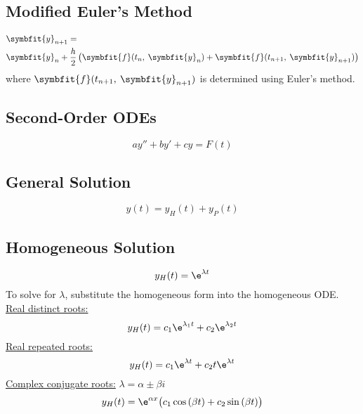 \documentclass{article}
\begin{document}
\begin{multicols}{3}
    \subsection*{Modified Euler's Method}
    \begin{align*}
         & \symbfit{y}_{n+1} =                                                                                                       \\
         & \symbfit{y}_{n} + \frac{h}{2}\left( \symbfit{f}(t_n,\: \symbfit{y}_n) + \symbfit{f}(t_{n+1},\: \symbfit{y}_{n+1}) \right)
    \end{align*}
    where \(\symbfit{f}(t_{n+1},\: \symbfit{y}_{n+1})\) is determined using Euler's method.
    \subsection*{Second-Order ODEs}
    \begin{equation*}
        ay'' + by' + cy = F(t)
    \end{equation*}
    \subsection*{General Solution}
    \begin{equation*}
        y(t) = y_H(t) + y_P(t)
    \end{equation*}
    \subsection*{Homogeneous Solution}
    \begin{equation*}
        y_H(t) = \e^{\lambda t}
    \end{equation*}
    To solve for \(\lambda\), substitute the homogeneous form into the homogeneous ODE\@. \\
    \underline{Real distinct roots:}
    \begin{equation*}
        y_H(t) = c_1\e^{\lambda_1 t} + c_2\e^{\lambda_2 t}
    \end{equation*}
    \underline{Real repeated roots:}
    \begin{equation*}
        y_H(t) = c_1\e^{\lambda t} + c_2 t\e^{\lambda t}
    \end{equation*}
    \underline{Complex conjugate roots:} \(\lambda = \alpha \pm \beta i\)
    \begin{equation*}
        y_H(t) = \e^{\alpha x}\bigl( c_1\cos{\left( \beta t \right)} + c_2 \sin{\left( \beta t \right)} \bigr)
    \end{equation*}

\end{multicols}
\end{document}
